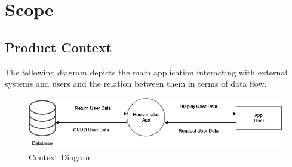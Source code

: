 \documentclass[12pt]{article}
\newcommand{\lips}{\textit{Insert your content here.}}
\begin{document}


\section{Scope}
\subsection{Product Context}
The following diagram depicts the main application interacting with external systems and users and the relation between them in terms of data flow.
\begin{figure}[H]
    \centering
	\includegraphics[width=15cm]{ContextDiagram.png}
	\caption{Context Diagram}
 \label{}
\end{figure}
\end{document}
